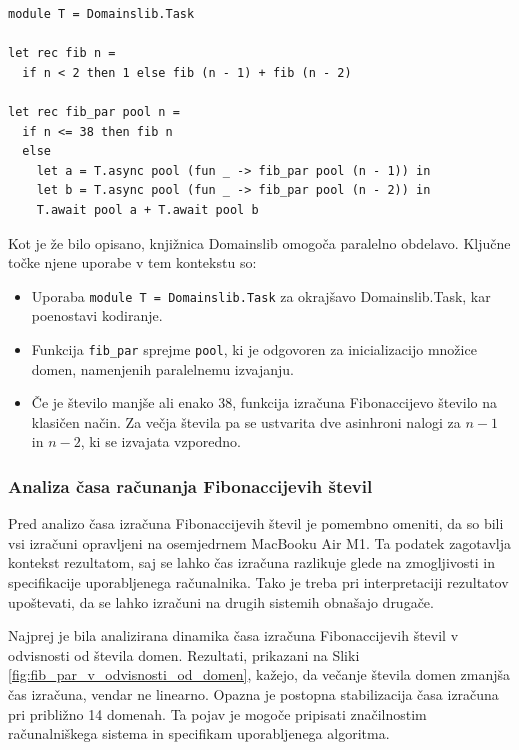 \documentclass[mat1, tisk]{fmfdelo}
\begin{document}
\begin{lstlisting}
module T = Domainslib.Task

let rec fib n = 
  if n < 2 then 1 else fib (n - 1) + fib (n - 2)

let rec fib_par pool n =
  if n <= 38 then fib n
  else
    let a = T.async pool (fun _ -> fib_par pool (n - 1)) in
    let b = T.async pool (fun _ -> fib_par pool (n - 2)) in
    T.await pool a + T.await pool b
\end{lstlisting}

Kot je že bilo opisano, knjižnica Domainslib omogoča paralelno obdelavo. Ključne točke njene uporabe v tem kontekstu so:
\begin{itemize}
  \item Uporaba \texttt{module T = Domainslib.Task} za okrajšavo Domainslib.Task, kar poenostavi kodiranje.
  \item Funkcija \texttt{fib\_par} sprejme \texttt{pool}, ki je odgovoren za inicializacijo množice domen,
        namenjenih paralelnemu izvajanju. 
  \item Če je število manjše ali enako 38, funkcija izračuna Fibonaccijevo število na klasičen način. 
        Za večja števila pa se ustvarita dve asinhroni nalogi za $n-1$ in $n-2$, ki se izvajata vzporedno.
\end{itemize}

\subsubsection{Analiza časa računanja Fibonaccijevih števil}

Pred analizo časa izračuna Fibonaccijevih števil je pomembno omeniti, da so bili vsi izračuni opravljeni na
osemjedrnem MacBooku Air M1. Ta podatek zagotavlja kontekst rezultatom, saj se lahko čas izračuna razlikuje
glede na zmogljivosti in specifikacije uporabljenega računalnika. Tako je treba pri interpretaciji rezultatov
upoštevati, da se lahko izračuni na drugih sistemih obnašajo drugače.

Najprej je bila analizirana dinamika časa izračuna Fibonaccijevih števil v odvisnosti od števila domen. 
Rezultati, prikazani na Sliki \ref{fig:fib_par_v_odvisnosti_od_domen}, kažejo, da večanje števila domen zmanjša čas
izračuna, vendar ne linearno. Opazna je postopna stabilizacija časa izračuna pri približno 14 domenah. 
Ta pojav je mogoče pripisati značilnostim računalniškega sistema in specifikam uporabljenega algoritma.
\end{document}
